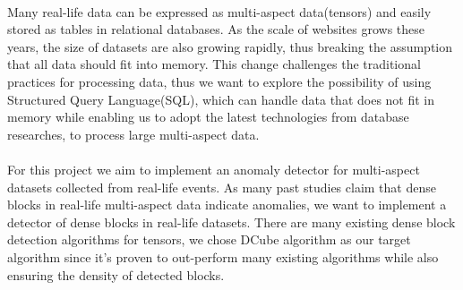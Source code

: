
\paragraph{} Many real-life data can be expressed as multi-aspect data(tensors) and easily stored as tables in relational databases. As the scale of websites grows these years, the size of datasets are also growing rapidly,
thus breaking the assumption that all data should fit into memory. This change challenges the traditional practices for processing data, thus we want to explore the possibility of using Structured Query Language(SQL),
which can handle data that does not fit in memory while enabling us to adopt the latest technologies from database researches, to process large multi-aspect data.
\paragraph{} For this project we aim to implement an anomaly detector for multi-aspect datasets collected from real-life events. As many past studies claim that dense blocks in real-life multi-aspect data indicate anomalies, we want to implement a detector of dense blocks
in real-life datasets. There are many existing dense block detection algorithms for tensors, we chose DCube algorithm as our target algorithm since it's proven to out-perform many existing algorithms while also ensuring the density of detected
blocks.